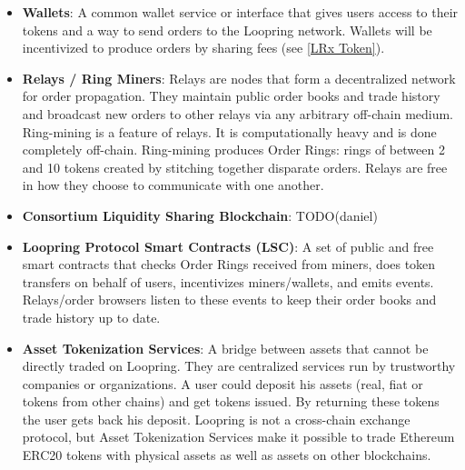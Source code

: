 \documentclass[UTF8,nofonts]{article}
\begin{document}
\begin{itemize}

\item \textbf{Wallets}: A common wallet service or interface that gives users access to their tokens and a way to send orders to the Loopring network. Wallets will be incentivized to produce orders by sharing fees (see \ref{LRx Token}).

\item \textbf{Relays / Ring Miners}: Relays are nodes that form a decentralized network for order propagation. They maintain public order books and trade history and broadcast new orders to other relays via any arbitrary off-chain medium. Ring-mining is a feature of relays. It is computationally heavy and is done completely off-chain. Ring-mining produces Order Rings: rings of between 2 and 10 tokens created by stitching together disparate orders. Relays are free in how they choose to communicate with one another. 

\item \textbf{Consortium Liquidity Sharing Blockchain}: TODO(daniel)

\item \textbf{Loopring Protocol Smart Contracts (LSC)}: A set of public and free smart contracts that checks Order Rings received from miners, does token transfers on behalf of users, incentivizes miners/wallets, and emits events. Relays/order browsers listen to these events to keep their order books and trade history up to date.

\item \textbf{Asset Tokenization Services}: A bridge between assets that cannot be directly traded on Loopring. They are centralized services run by trustworthy companies or organizations. A user could deposit his assets (real, fiat or tokens from other chains) and get tokens issued. By returning these tokens the user gets back his deposit. Loopring is not a cross-chain exchange protocol, but Asset Tokenization Services make it possible to trade Ethereum ERC20 \cite{ERC20} tokens with physical assets as well as assets on other blockchains. 

\end{itemize}
\end{document}
